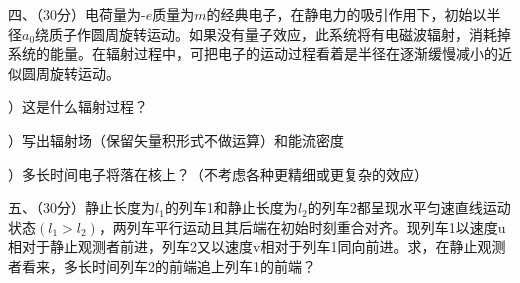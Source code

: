 \noindent
四、\hspace{0.2em}（30分）电荷量为-$e$质量为$m$的经典电子，在静电力的吸引作用下，初始以半径$a_0$绕质子作圆周旋转运动。如果没有量子效应，此系统将有电磁波辐射，消耗掉系统的能量。在辐射过程中，可把电子的运动过程看着是半径在逐渐缓慢减小的近似圆周旋转运动。

）\hspace{0.2em}这是什么辐射过程？

）\hspace{0.2em}写出辐射场（保留矢量积形式不做运算）和能流密度

）\hspace{0.2em}多长时间电子将落在核上？（不考虑各种更精细或更复杂的效应）

\vspace{3cm}
\noindent
五、\hspace{0.2em}（30分）静止长度为$l_1$的列车1和静止长度为$l_2$的列车2都呈现水平匀速直线运动状态$(l_1 > l_2)$，两列车平行运动且其后端在初始时刻重合对齐。现列车1以速度u相对于静止观测者前进，列车2又以速度v相对于列车1同向前进。求，在静止观测者看来，多长时间列车2的前端追上列车1的前端？

